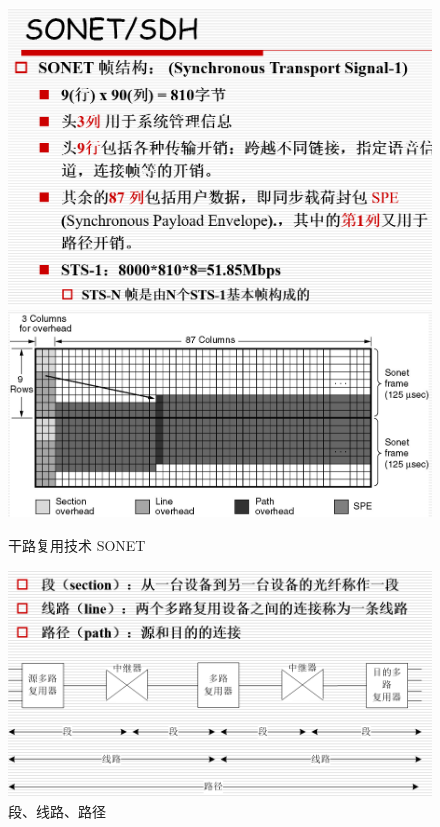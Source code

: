 \documentclass[UTF8,a4paper]{ctexart}
\begin{document}
  \begin{figure}[H]
    \centering
    \includegraphics[scale = 0.3]{assets/jisuanjiwangluo_b4683.png}
    \includegraphics[scale = 0.3]{assets/jisuanjiwangluo_25858.png}
    \caption{干路复用技术 SONET}
  \end{figure}


  \begin{figure}[H]
    \centering
    \includegraphics[scale = 0.3]{assets/jisuanjiwangluo_b52d1.png}
    \caption{段、线路、路径}
  \end{figure}
\end{document}
